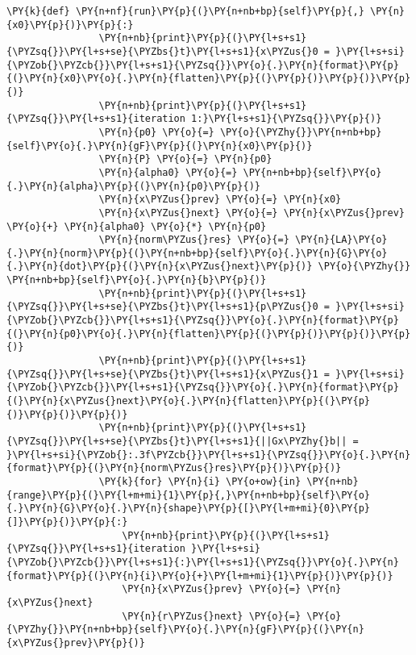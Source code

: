 \begin{Verbatim}[commandchars=\\\{\}]
            \PY{k}{def} \PY{n+nf}{run}\PY{p}{(}\PY{n+nb+bp}{self}\PY{p}{,} \PY{n}{x0}\PY{p}{)}\PY{p}{:}
                \PY{n+nb}{print}\PY{p}{(}\PY{l+s+s1}{\PYZsq{}}\PY{l+s+se}{\PYZbs{}t}\PY{l+s+s1}{x\PYZus{}0 = }\PY{l+s+si}{\PYZob{}\PYZcb{}}\PY{l+s+s1}{\PYZsq{}}\PY{o}{.}\PY{n}{format}\PY{p}{(}\PY{n}{x0}\PY{o}{.}\PY{n}{flatten}\PY{p}{(}\PY{p}{)}\PY{p}{)}\PY{p}{)}
                \PY{n+nb}{print}\PY{p}{(}\PY{l+s+s1}{\PYZsq{}}\PY{l+s+s1}{iteration 1:}\PY{l+s+s1}{\PYZsq{}}\PY{p}{)}
                \PY{n}{p0} \PY{o}{=} \PY{o}{\PYZhy{}}\PY{n+nb+bp}{self}\PY{o}{.}\PY{n}{gF}\PY{p}{(}\PY{n}{x0}\PY{p}{)}
                \PY{n}{P} \PY{o}{=} \PY{n}{p0}
                \PY{n}{alpha0} \PY{o}{=} \PY{n+nb+bp}{self}\PY{o}{.}\PY{n}{alpha}\PY{p}{(}\PY{n}{p0}\PY{p}{)}
                \PY{n}{x\PYZus{}prev} \PY{o}{=} \PY{n}{x0}
                \PY{n}{x\PYZus{}next} \PY{o}{=} \PY{n}{x\PYZus{}prev} \PY{o}{+} \PY{n}{alpha0} \PY{o}{*} \PY{n}{p0}
                \PY{n}{norm\PYZus{}res} \PY{o}{=} \PY{n}{LA}\PY{o}{.}\PY{n}{norm}\PY{p}{(}\PY{n+nb+bp}{self}\PY{o}{.}\PY{n}{G}\PY{o}{.}\PY{n}{dot}\PY{p}{(}\PY{n}{x\PYZus{}next}\PY{p}{)} \PY{o}{\PYZhy{}} \PY{n+nb+bp}{self}\PY{o}{.}\PY{n}{b}\PY{p}{)}
                \PY{n+nb}{print}\PY{p}{(}\PY{l+s+s1}{\PYZsq{}}\PY{l+s+se}{\PYZbs{}t}\PY{l+s+s1}{p\PYZus{}0 = }\PY{l+s+si}{\PYZob{}\PYZcb{}}\PY{l+s+s1}{\PYZsq{}}\PY{o}{.}\PY{n}{format}\PY{p}{(}\PY{n}{p0}\PY{o}{.}\PY{n}{flatten}\PY{p}{(}\PY{p}{)}\PY{p}{)}\PY{p}{)}
                \PY{n+nb}{print}\PY{p}{(}\PY{l+s+s1}{\PYZsq{}}\PY{l+s+se}{\PYZbs{}t}\PY{l+s+s1}{x\PYZus{}1 = }\PY{l+s+si}{\PYZob{}\PYZcb{}}\PY{l+s+s1}{\PYZsq{}}\PY{o}{.}\PY{n}{format}\PY{p}{(}\PY{n}{x\PYZus{}next}\PY{o}{.}\PY{n}{flatten}\PY{p}{(}\PY{p}{)}\PY{p}{)}\PY{p}{)}
                \PY{n+nb}{print}\PY{p}{(}\PY{l+s+s1}{\PYZsq{}}\PY{l+s+se}{\PYZbs{}t}\PY{l+s+s1}{||Gx\PYZhy{}b|| = }\PY{l+s+si}{\PYZob{}:.3f\PYZcb{}}\PY{l+s+s1}{\PYZsq{}}\PY{o}{.}\PY{n}{format}\PY{p}{(}\PY{n}{norm\PYZus{}res}\PY{p}{)}\PY{p}{)}
                \PY{k}{for} \PY{n}{i} \PY{o+ow}{in} \PY{n+nb}{range}\PY{p}{(}\PY{l+m+mi}{1}\PY{p}{,}\PY{n+nb+bp}{self}\PY{o}{.}\PY{n}{G}\PY{o}{.}\PY{n}{shape}\PY{p}{[}\PY{l+m+mi}{0}\PY{p}{]}\PY{p}{)}\PY{p}{:}
                    \PY{n+nb}{print}\PY{p}{(}\PY{l+s+s1}{\PYZsq{}}\PY{l+s+s1}{iteration }\PY{l+s+si}{\PYZob{}\PYZcb{}}\PY{l+s+s1}{:}\PY{l+s+s1}{\PYZsq{}}\PY{o}{.}\PY{n}{format}\PY{p}{(}\PY{n}{i}\PY{o}{+}\PY{l+m+mi}{1}\PY{p}{)}\PY{p}{)}
                    \PY{n}{x\PYZus{}prev} \PY{o}{=} \PY{n}{x\PYZus{}next}
                    \PY{n}{r\PYZus{}next} \PY{o}{=} \PY{o}{\PYZhy{}}\PY{n+nb+bp}{self}\PY{o}{.}\PY{n}{gF}\PY{p}{(}\PY{n}{x\PYZus{}prev}\PY{p}{)}

\end{Verbatim}
